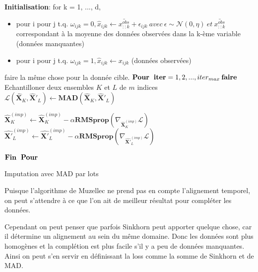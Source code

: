 \documentclass[acmsmall, natbib=false, nonacm]{acmart}
\begin{document}
\begin{algorithm}[H]
    \tabto{0.2cm}\textbf{Initialisation}: for k = 1, ..., d,
    \begin{itemize}
        \item pour i pour j t.q. $\omega_{ijk} = 0, \hat{x}_{ijk} \leftarrow \bar{x_{::k}^{\textit{obs}}} + \epsilon_{ijk}\: avec\: \epsilon \sim \mathcal{N}(0,\eta)\: et\: \bar{x_{::k}^{\textit{obs}}}$ correspondant à la moyenne des données observées dans la k-ème variable (données manquantes)
        \item pour i pour j t.q. $\omega_{ijk} = 1, \hat{x}_{ijk} \leftarrow x_{ijk}$ (données observées)
    \end{itemize}
    \tabto{0.2cm} faire la même chose pour la donnée cible. 
    \tabto{0.2cm}$\textbf{Pour\: iter} = 1,2, ..., iter_{max}\: \textbf{faire}$
    \tabto{1cm}Echantilloner deux ensembles $\textit{K}$ et $\textit{L}$ de $\textit{m}$ indices 
    \tabto{1cm}$\mathcal{L}(\hat{\textbf{X}}_{\textit{K}},\hat{\textbf{X}}'_{\textit{L}}) \leftarrow \textbf{MAD}(\hat{\textbf{X}}_{\textit{K}},\hat{\textbf{X}}'_{\textit{L}})$
    
    \tabto{1cm}$\hat{\textbf{X}}_{\textit{K}}^{(\textit{imp})} \leftarrow \hat{\textbf{X}}_{\textit{K}}^{(\textit{imp})} - \alpha \textbf{RMSprop}(\nabla_{\hat{\textbf{X}}_{\textit{K}}^{(\textit{imp})}} \mathcal{L})$
    \tabto{1cm}$\hat{\textbf{X}'}_{\textit{L}}^{(\textit{imp})} \leftarrow \hat{\textbf{X}'}_{\textit{L}}^{(\textit{imp})} - \alpha \textbf{RMSprop}(\nabla_{\hat{\textbf{X}'}_{\textit{L}}^{(\textit{imp})}} \mathcal{L})$
    
    \tabto{0.2cm}$\textbf{Fin\: Pour}$
    
    
    
    \caption{{Imputation avec MAD par lots} \label{Algorithm2}}
    
\end{algorithm}

Puisque l'algorithme de Muzellec ne prend pas en compte l'alignement temporel, 
on peut s'attendre à ce que l'on ait de meilleur résultat pour compléter les données.

Cependant on peut penser que parfois Sinkhorn peut apporter quelque chose, 
car il détermine un alignement au sein du même domaine.
Donc les données sont plus homogènes et la complétion est plus facile s'il y a peu de données manquantes.
Ainsi on peut s'en servir en définissant la loss comme la somme de Sinkhorn et de MAD.
\end{document}
